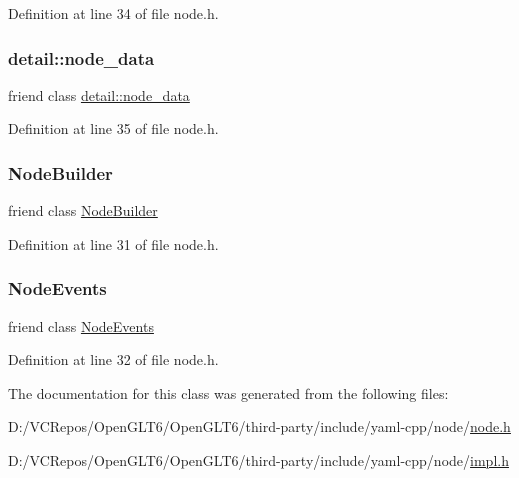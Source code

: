 Definition at line 34 of file node.\+h.

\mbox{\label{class_y_a_m_l_1_1_node_a21fe8a2c1cad43a713578f42e65878d6}} 
\subsubsection{\texorpdfstring{detail::node\_data}{detail::node\_data}}
{\footnotesize\ttfamily friend class \mbox{\hyperlink{class_y_a_m_l_1_1detail_1_1node__data}{detail\+::node\+\_\+data}}\hspace{0.3cm}{\ttfamily [friend]}}



Definition at line 35 of file node.\+h.

\mbox{\label{class_y_a_m_l_1_1_node_a3698ada19fa4946ec1b589a2b23e695f}} 
\subsubsection{\texorpdfstring{NodeBuilder}{NodeBuilder}}
{\footnotesize\ttfamily friend class \mbox{\hyperlink{class_y_a_m_l_1_1_node_builder}{Node\+Builder}}\hspace{0.3cm}{\ttfamily [friend]}}



Definition at line 31 of file node.\+h.

\mbox{\label{class_y_a_m_l_1_1_node_a499f933f221a93e5f5fe7f1a18f8f25b}} 
\subsubsection{\texorpdfstring{NodeEvents}{NodeEvents}}
{\footnotesize\ttfamily friend class \mbox{\hyperlink{class_y_a_m_l_1_1_node_events}{Node\+Events}}\hspace{0.3cm}{\ttfamily [friend]}}



Definition at line 32 of file node.\+h.



The documentation for this class was generated from the following files\+:\begin{DoxyCompactItemize}
\item 
D\+:/\+V\+C\+Repos/\+Open\+G\+L\+T6/\+Open\+G\+L\+T6/third-\/party/include/yaml-\/cpp/node/\mbox{\hyperlink{node_8h}{node.\+h}}\item 
D\+:/\+V\+C\+Repos/\+Open\+G\+L\+T6/\+Open\+G\+L\+T6/third-\/party/include/yaml-\/cpp/node/\mbox{\hyperlink{impl_8h}{impl.\+h}}\end{DoxyCompactItemize}
